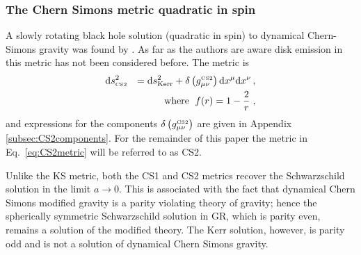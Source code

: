 \subsubsection{The Chern Simons metric quadratic in spin}\label{subsec:CS2}
A slowly rotating black hole solution (quadratic in spin) to dynamical Chern-Simons gravity was found by \cite{2012PhRvD..86d4037Y}. As far as the authors are aware disk emission in this metric has not been considered before. The metric is
\begin{eqnarray}\label{eq:CS2metric} &\textrm{d}s^{2}_{\mbox{\tiny CS2}} &= \textrm{d}s^{2}_{\textrm{Kerr}}+\delta\left(g_{\mu\nu}^{\mbox{\tiny CS2}} \right)\textrm{d}x^{\mu}\textrm{d}x^{\nu}\, , \nonumber \\
&& \textrm{where }\; f(r)=1-\frac{2}{r}\; ,\end{eqnarray}
and expressions for the components $\delta\left(g_{\mu\nu}^{\mbox{\tiny CS2}} \right)$ are given in Appendix \ref{subsec:CS2components}. For the remainder of this paper the metric in Eq.\ \ref{eq:CS2metric} will be referred to as CS2.

Unlike the KS metric, both the CS1 and CS2 metrics recover the Schwarzschild solution in the limit $a\rightarrow 0$. This is associated with the fact that dynamical Chern Simons modified gravity is a parity violating theory of gravity; hence the spherically symmetric Schwarzschild solution in GR, which is parity even, remains a solution of the modified theory. The Kerr solution, however, is parity odd and is not a solution of dynamical Chern Simons gravity.

